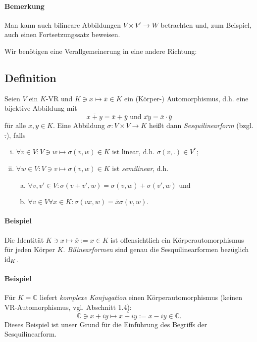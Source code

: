 \paragraph{Bemerkung}
	Man kann auch bilineare Abbildungen $ V\times V'\to W $ betrachten und, zum Beispiel, auch einen Fortsetzungssatz beweisen.
	
	Wir benötigen eine Verallgemeinerung in eine andere Richtung:
\subsection{Definition} 
\begin{Definition}[Sesquilinearform]
Seien $ V $ ein $ K $-VR und $ K\ni x\mapsto \overline{x}\in K $ ein (Körper-) Automorphismus, d.h. eine bijektive Abbildung mit
		\[ \overline{x+y} = \overline{x}+\overline{y} \text{ und } \overline{xy} = \overline{x}\cdot \overline{y} \]
	für alle $ x,y\in K $. Eine Abbildung $ \sigma: V\times V \to K $ heißt dann \emph{Sesquilinearform} (bzgl. $ \bar{.} $), falls
		\begin{enumerate}[(i)]
			\item $ \forall v\in V: V\ni w \mapsto \sigma(v,w)\in K $ ist linear, d.h. $ \sigma(v,.)\in V^* $;
			\item $ \forall w\in V: V\ni v \mapsto \sigma(v,w)\in K $ ist \emph{semilinear}, d.h.
				\begin{enumerate}[(a)]
					\item $ \forall v,v' \in V: \sigma(v+v',w) = \sigma(v,w)+\sigma(v',w) $ und
					\item $ \forall v\in V\forall x\in K: \sigma(vx,w) = \overline{x}\sigma(v,w) $.
				\end{enumerate}
		\end{enumerate}
\end{Definition}

\paragraph{Beispiel}
	Die Identität $ K\ni x\mapsto \overline{x}:= x\in K $ ist offensichtlich ein Körperautomorphismus für jeden Körper $ K $. \emph{Bilinearformen} sind genau die Sesquilinearformen bezüglich $ \operatorname{id}_K $.
\paragraph{Beispiel}
	Für $ K = \mathbb{C} $ liefert \emph{komplexe Konjugation} einen Körperautomorphismus (keinen VR-Automorphismus, vgl. Abschnitt 1.4):
		\[ \mathbb{C}\ni x+iy \mapsto \overline{x+iy}:= x-iy \in \mathbb{C}. \]
	Dieses Beispiel ist unser Grund für die Einführung des Begriffs der Sesquilinearform.
